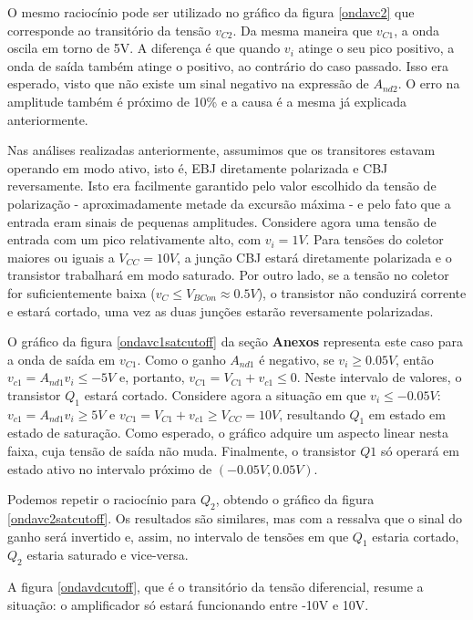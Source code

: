 \documentclass[12pt, a4paper]{article}
\begin{document}
\begin{enumerate}
    O mesmo raciocínio pode ser utilizado no gráfico da figura \ref{ondavc2} que corresponde ao transitório da tensão \(v_{C2}\). Da mesma maneira que \(v_{C1}\), a onda oscila em torno de 5V. A diferença é que quando \(v_i\) atinge o seu pico positivo, a onda de saída também atinge o positivo, ao contrário do caso passado. Isso era esperado, visto que não existe um sinal negativo na expressão de \(A_{nd2}\). O erro na amplitude também é próximo de 10\% e a causa é a mesma já explicada anteriormente.
    
    Nas análises realizadas anteriormente, assumimos que os transitores estavam operando em modo ativo, isto é, EBJ diretamente polarizada e CBJ reversamente. Isto era facilmente garantido pelo valor escolhido da tensão de polarização - aproximadamente metade da excursão máxima - e pelo fato que a entrada eram sinais de pequenas amplitudes. Considere agora uma tensão de entrada com um pico relativamente alto, com \(v_i = 1V\). Para tensões do coletor maiores ou iguais a \(V_{CC}=10V\), a junção CBJ estará diretamente polarizada e o transistor trabalhará em modo saturado. Por outro lado, se a tensão no coletor for suficientemente baixa (\(v_C \le V_{BCon} \approx 0.5V \)), o transistor não conduzirá corrente e estará cortado, uma vez as duas junções estarão reversamente polarizadas. 
    
    O gráfico da figura \ref{ondavc1satcutoff} da seção \textbf{Anexos} representa este caso para a onda de saída em \(v_{C1}\). Como o ganho \(A_{nd1}\) é negativo, se \(v_i \ge 0.05V\), então \(v_{c1} = A_{nd1}v_i \le -5V\) e, portanto, \(v_{C1} = V_{C1} + v_{c1} \le 0\). Neste intervalo de valores, o transistor \(Q_1\) estará cortado. Considere agora a situação em que \(v_i \le -0.05V\): \(v_{c1} = A_{nd1}v_i \ge 5V\) e \(v_{C1} = V_{C1} + v_{c1} \ge V_{CC} = 10V\), resultando \(Q_1\) em estado em estado de saturação. Como esperado, o gráfico adquire um aspecto linear nesta faixa, cuja tensão de saída não muda. Finalmente, o transistor \(Q1\) só operará em estado ativo no intervalo próximo de \((-0.05V , 0.05V)\).
    
    Podemos repetir o raciocínio para \(Q_2\), obtendo o gráfico da figura \ref{ondavc2satcutoff}. Os resultados são similares, mas com a ressalva que o sinal do ganho será invertido e, assim, no intervalo de tensões em que \(Q_1\) estaria cortado, \(Q_2\) estaria saturado e vice-versa.
    
    A figura \ref{ondavdcutoff}, que é o transitório da tensão diferencial, resume a situação: o amplificador só estará funcionando entre -10V e 10V. 
    

\end{enumerate}
\end{document}
